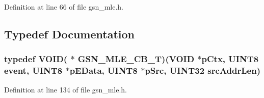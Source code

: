 Definition at line 66 of file gsn\_\-mle.h.



\subsection{Typedef Documentation}
\hypertarget{a00527_ab913f34ba94e3fffc3ebcc67f2df5c3e}{
\subsubsection[{GSN\_\-MLE\_\-CB\_\-T}]{\setlength{\rightskip}{0pt plus 5cm}typedef VOID( $\ast$ {\bf GSN\_\-MLE\_\-CB\_\-T})(VOID $\ast$pCtx, {\bf UINT8} event, {\bf UINT8} $\ast$pEData, {\bf UINT8} $\ast$pSrc, {\bf UINT32} srcAddrLen)}}
\label{a00527_ab913f34ba94e3fffc3ebcc67f2df5c3e}


Definition at line 134 of file gsn\_\-mle.h.

